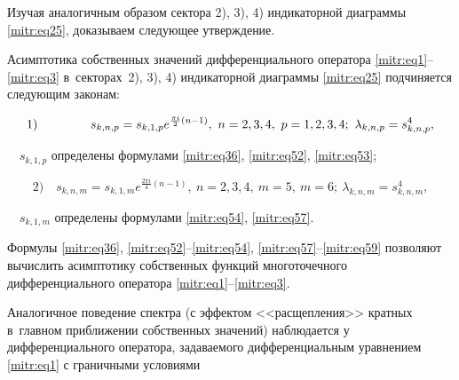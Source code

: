 \smallskip



Изучая аналогичным образом сектора 2), 3), 4) индикаторной диаграммы \eqref{mitr:eq25}, доказываем следующее утверждение.



\smallskip



\hypertarget{mitr:th3}{}



\begin{theorem}[3]Асимптотика собственных значений дифференциального оператора \eqref{mitr:eq1}--\eqref{mitr:eq3} в~секторах~{\rm2), 3), 4)} индикаторной диаграммы \eqref{mitr:eq25} подчиняется следующим законам\/{\rm:}

\begin{equation}

\label{mitr:eq59}

1)\hskip1.5cm \hfill s_{k,n,p}=s_{k,1,p}e^{\frac{\pi i}2(n-1)}, \ n=2,3,4, \ p=1,2,3,4; \

\lambda_{k,n,p}=s^4_{k,n,p}, \hfill

\end{equation}



~~$s_{k,1,p}$ определены формулами \eqref{mitr:eq36}, \eqref{mitr:eq52}, \eqref{mitr:eq53};

\begin{equation}

\label{mitr:eq59}

2)\quad s_{k,n,m}=s_{k,1,m}e^{\frac{2\pi i}4(n-1)}, \ n=2,3,4, \ m=5, \ m=6; \

\lambda_{k,n,m}=s^4_{k,n,m},

\end{equation}



~~$s_{k,1,m}$ определены формулами \eqref{mitr:eq54}, \eqref{mitr:eq57}.

\end{theorem}



Формулы \eqref{mitr:eq36}, \eqref{mitr:eq52}--\eqref{mitr:eq54}, \eqref{mitr:eq57}--\eqref{mitr:eq59} позволяют вычислить асимптотику собственных функций многоточечного дифференциального оператора \eqref{mitr:eq1}--\eqref{mitr:eq3}.



Аналогичное поведение спектра (с эффектом <<расщепления>> кратных в~главном приближении собственных значений) наблюдается у дифференциального оператора, задаваемого дифференциальным уравнением \eqref{mitr:eq1} с граничными условиями

